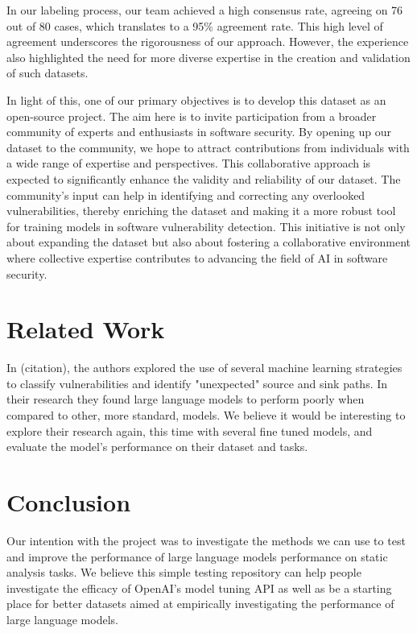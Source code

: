 \documentclass[acmsmall]{acmart}
\begin{document}
In our labeling process, our team achieved a high consensus rate, agreeing on 76 out of 80 cases, which translates to a 95\% agreement rate. This high level of agreement underscores the rigorousness of our approach. However, the experience also highlighted the need for more diverse expertise in the creation and validation of such datasets.

In light of this, one of our primary objectives is to develop this dataset as an open-source project. The aim here is to invite participation from a broader community of experts and enthusiasts in software security. By opening up our dataset to the community, we hope to attract contributions from individuals with a wide range of expertise and perspectives. This collaborative approach is expected to significantly enhance the validity and reliability of our dataset. The community's input can help in identifying and correcting any overlooked vulnerabilities, thereby enriching the dataset and making it a more robust tool for training models in software vulnerability detection. This initiative is not only about expanding the dataset but also about fostering a collaborative environment where collective expertise contributes to advancing the field of AI in software security.

\section{Related Work}

In (citation), the authors explored the use of several machine learning strategies to classify vulnerabilities and identify "unexpected" source and sink paths. In their research they found large language models to perform poorly when compared to other, more standard, models. We believe it would be interesting to explore their research again, this time with several fine tuned models, and evaluate the model's performance on their dataset and tasks.

\section{Conclusion}
Our intention with the project was to investigate the methods we can use to test and improve the performance of large language models performance on static analysis tasks. We believe this simple testing repository can help people investigate the efficacy of OpenAI's model tuning API as well as be a starting place for better datasets aimed at empirically investigating the performance of large language models.
\end{document}
